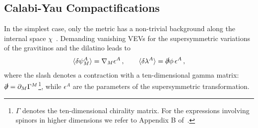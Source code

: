 \documentclass[12pt,a4paper]{book}
\begin{document}
\subsection{Calabi-Yau Compactifications}
\label{ssec:CYCompactifications}

In the simplest case, only the metric has a non-trivial background along the internal space $\chi$~\cite{Candelas:1985en}. Demanding vanishing VEVs for the supersymmetric variations of the gravitinos and the dilatino leads to
\begin{align}
\label{eq:SUSYconditionFluxlessCase}
\langle \delta \psi_M^A \rangle = \nabla_M \epsilon^A\,, \qquad \langle \delta \lambda^A \rangle = \slashed{\partial} \phi \, \epsilon^A \,,
\end{align}
where the slash denotes a contraction with a ten-dimensional gamma matrix: $\slashed{\partial} = \partial_M \Gamma^M$\footnote{$\Gamma$ denotes the ten-dimensional chirality matrix. For the expressions involving spinors in higher dimensions we refer to Appendix B of~\cite{Polchinski:1998rr}.}, while $\epsilon^A$ are the parameters of the supersymmetric transformation.\\
\end{document}
